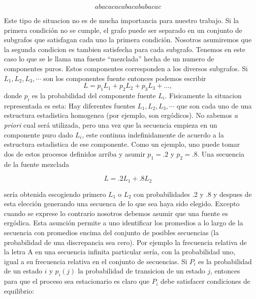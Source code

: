 \begin{equation}
a b a c a c a c a b a c a b a b a c a c
\end{equation}

Este tipo de situacion no es de mucha importancia para nuestro
trabajo.  Si la primera condici\'{o}n no se cumple, el grafo puede ser
separado en un conjunto de subgrafos que satisfagan cada uno la
primera condici\'{o}n.  Nosotros asumiremos que la segunda condicion
es tambien satisfecha para cada subgrafo.  Tenemos en este caso lo que
se le llama una fuente ``mezclada'' hecha de un numero de componentes
puros. Estos componentes corresponden a los diversos subgrafos. Si
$L_{1}, L_{2}, L_{3}, \cdots$ son los componentes fuente entonces
podemos escribir
\begin{equation}
L = p_{1}L_{1} + p_{2}L_{2} + p_{3}L_{3} + \ldots,
\end{equation}
donde $p_{i}$ es la probabilidad del componente fuente $L_{i}$.
Fisicamente la situacion representada es esta: Hay diferentes fuentes
$L_{1}, L_{2}, L_{3}, \cdots$ que son cada uno de una estructura
estadistica homogenea (por ejemplo, son erg\'{o}dicos). No sabemos
\textit{a priori} cual será utilizada, pero una vez que la secuencia
empieza en un componente puro dado $L_{i}$, este continua
indefinidamente de acuerdo a la estructura estadistica de ese
componente.  Como un ejemplo, uno puede tomar dos de estos procesos
definidos arriba y asumir $p_{1} = .2$ y $p_{2} = .8$. Una secuencia
de la fuente mezclada

\begin{equation}
L = .2L_{1} + .8L_{2}
\end{equation}

ser\'{i}a obtenida escogiendo primero $L_{1}$ o $L_{2}$ con
probabilidades .2 y .8 y despues de esta elecci\'{o}n generando una
secuenca de lo que sea haya sido elegido.  Excepto cuando se exprese
lo contrario nosotros debemos asumir que una fuente es
erg\'{o}dica. Esta asunci\'{o}n permite a uno identificar los
promedios a lo largo de la secuencia con promedios encima del conjunto
de posibles secuencias (la probabilidad de una discrepancia sea
cero). Por ejemplo la frecuencia relativa de la letra A en una
secuencia infinita particular ser\'{i}a, con la probabilidad uno,
igual a su frecuencia relativa en el conjunto de secuencias.  Si
$P_{i}$ es la probabilidad de un estado $i$ y $p_{i}(j)$ la
probabilidad de transicion de un estado $j$, entonces para que el
proceso sea estacionario es claro que $P_{i}$ debe satisfacer
condiciones de equilibrio:

